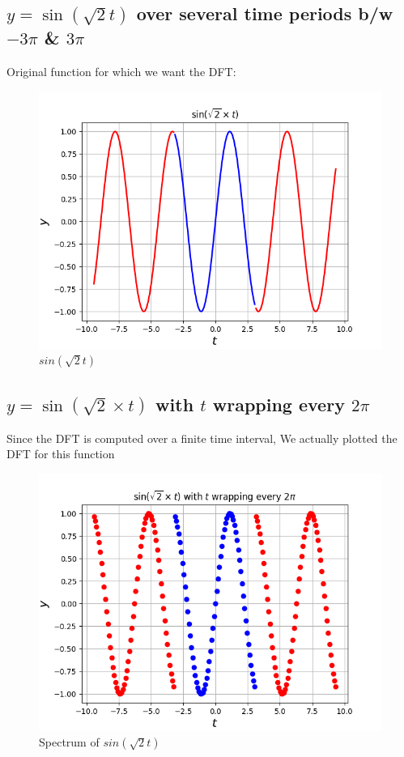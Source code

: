 \documentclass{article}
\begin{document}
\subsection{$y=\sin\left(\sqrt{2} t\right)$ over several time periods b/w $-3\pi$ \& $3\pi$}
Original function for which we want the DFT:
\begin{figure}[h!]
\centering
\includegraphics[scale=0.5]{Figure_2.png}
\caption{$sin(\sqrt{2}t)$}
\label{fig:universe}
\end{figure}

\newpage

\subsection{$y=\sin\left(\sqrt{2}\times t\right)$ with $t$ wrapping every $2\pi$}

Since the DFT is computed over a finite time interval, We actually plotted the DFT for this function
\begin{figure}[h!]
\centering
\includegraphics[scale=0.5]{Figure_3.png}
\caption{Spectrum of $sin(\sqrt{2}t)$}
\label{fig:universe}
\end{figure}
\end{document}
